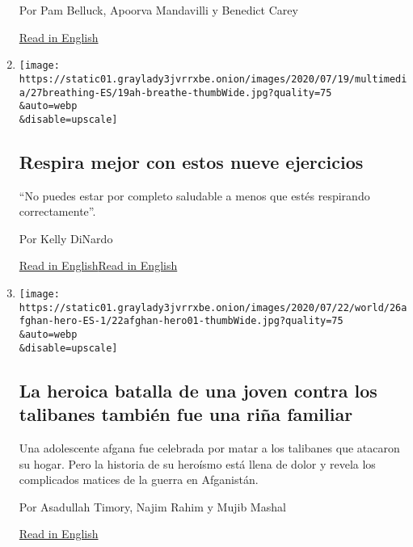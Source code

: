 \begin{enumerate}
  Por Pam Belluck, Apoorva Mandavilli y Benedict Carey

  \href{https://www.nytimes3xbfgragh.onion/2020/07/11/health/coronavirus-schools-reopen.html}{Read
  in English}
\item
  \href{/es/2020/07/27/espanol/respira-mejor-con-estos-nueve-ejercicios.html}{}

  \texttt{[image: https://static01.graylady3jvrrxbe.onion/images/2020/07/19/multimedia/27breathing-ES/19ah-breathe-thumbWide.jpg?quality=75\\\&auto=webp\\\&disable=upscale]}

  \hypertarget{respira-mejor-con-estos-nueve-ejercicios}{%
  \subsection{Respira mejor con estos nueve
  ejercicios}\label{respira-mejor-con-estos-nueve-ejercicios}}

  ``No puedes estar por completo saludable a menos que estés respirando
  correctamente''.

  Por Kelly DiNardo

  \href{https://www.nytimes3xbfgragh.onion/2020/07/18/at-home/coronavirus-breathing-exercises.html}{Read
  in
  English}\href{https://www.nytimes3xbfgragh.onion/2020/07/18/at-home/coronavirus-breathing-exercises.html}{Read
  in English}
\item
  \href{/es/2020/07/26/espanol/mundo/guerra-afganistan-mujeres.html}{}

  \texttt{[image: https://static01.graylady3jvrrxbe.onion/images/2020/07/22/world/26afghan-hero-ES-1/22afghan-hero01-thumbWide.jpg?quality=75\\\&auto=webp\\\&disable=upscale]}

  \hypertarget{la-heroica-batalla-de-una-joven-contra-los-talibanes-tambiuxe9n-fue-una-riuxf1a-familiar}{%
  \subsection{La heroica batalla de una joven contra los talibanes
  también fue una riña
  familiar}\label{la-heroica-batalla-de-una-joven-contra-los-talibanes-tambiuxe9n-fue-una-riuxf1a-familiar}}

  Una adolescente afgana fue celebrada por matar a los talibanes que
  atacaron su hogar. Pero la historia de su heroísmo está llena de dolor
  y revela los complicados matices de la guerra en Afganistán.

  Por Asadullah Timory, Najim Rahim y Mujib Mashal

  \href{https://www.nytimes3xbfgragh.onion/2020/07/22/world/asia/afghan-hero-woman-taliban.html}{Read
  in English}
\end{enumerate}

